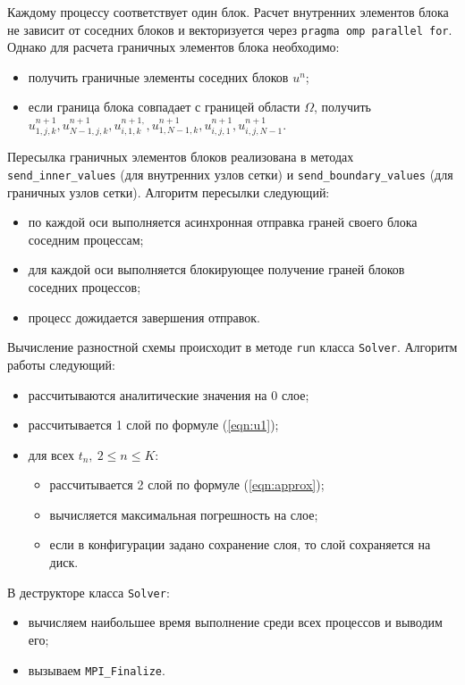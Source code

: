 \documentclass[oneside, final, 12pt]{extarticle}
\newcommand{\classname}[1]{\texttt{#1}}
\begin{document}
Каждому процессу соответствует один блок. Расчет внутренних элементов блока не зависит от соседних блоков и
векторизуется через \classname{pragma omp parallel for}.
Однако для расчета граничных элементов блока необходимо:
\begin{itemize}
\item получить граничные элементы соседних блоков $ u^n $;
\item если граница блока совпадает с границей области $ \Omega $, получить
$ u^{n + 1}_{1,j,k}, u^{n + 1}_{N - 1,j,k}, u^{n + 1, }_{i,1,k}, u^{n + 1}_{1,N - 1,k}, u^{n + 1}_{i,j,1}, u^{n + 1}_{i,j,N - 1} $.
\end{itemize}

Пересылка граничных элементов блоков реализована в методах \classname{send\_inner\_values} (для внутренних узлов сетки) и \classname{send\_boundary\_values}
(для граничных узлов сетки). Алгоритм пересылки следующий:
\begin{itemize}
    \item по каждой оси выполняется асинхронная отправка граней своего блока соседним процессам;
    \item для каждой оси выполняется блокирующее получение граней блоков соседних процессов;
    \item процесс дожидается завершения отправок.
\end{itemize}

Вычисление разностной схемы происходит в методе \classname{run} класса \classname{Solver}. Алгоритм работы следующий:
\begin{itemize}
    \item рассчитываются аналитические значения на 0 слое;
    \item рассчитывается 1 слой по формуле (\ref{eqn:u1});
    \item для всех $ t_n, \: 2 \leq n \leq K $:
    \begin{itemize}
    \item рассчитывается 2 слой по формуле (\ref{eqn:approx});
    \item вычисляется максимальная погрешность на слое;
    \item если в конфигурации задано сохранение слоя, то слой сохраняется на диск.
    \end{itemize}
\end{itemize}

В деструкторе класса \classname{Solver}:
\begin{itemize}
    \item вычисляем наибольшее время выполнение среди всех процессов и выводим его;
    \item вызываем \classname{MPI\_Finalize}.
\end{itemize}
\end{document}
